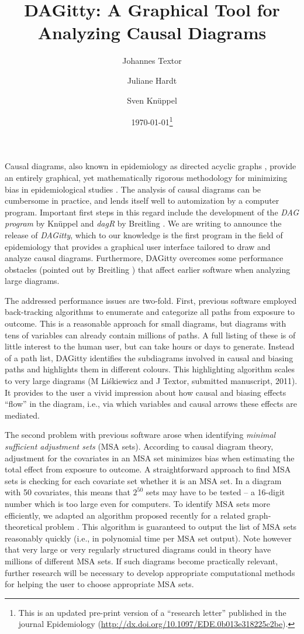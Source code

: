 \documentclass[12pt,letterpaper]{article}
\title{DAGitty: A Graphical Tool for Analyzing Causal Diagrams}
\author{Johannes Textor \and Juliane Hardt \and Sven Kn\"uppel}
\date{\today\footnote{This is an updated pre-print 
version of a ``research letter'' published in the journal Epidemiology
(\url{http://dx.doi.org/10.1097/EDE.0b013e318225c2be}).}}
\begin{document}
\maketitle

Causal diagrams, also known in epidemiology as directed 
acyclic graphs \cite{Pearl2000,GreenlandPR1999},
provide an entirely graphical, yet mathematically
rigorous methodology for minimizing bias in epidemiological studies 
\cite{ShrierP2008,RothmanGL2008}. 
The analysis of causal diagrams can be cumbersome in practice, 
and lends itself well 
to automization by a computer program. Important first steps in this 
regard include the development of the \emph{DAG program} by 
Knüppel \cite{KnueppelS2010} and \emph{dagR} by Breitling 
\cite{Breitling2010}. We are writing to announce the release of 
\emph{DAGitty}, which to our knowledge is the first program 
in the field of epidemiology that provides a graphical user interface 
tailored to draw and analyze causal diagrams. Furthermore, DAGitty overcomes 
some performance obstacles (pointed out by Breitling \cite{Breitling2010})
that affect earlier software when analyzing large diagrams.

The addressed performance issues are two-fold.
First, previous software employed back-tracking algorithms \cite{KnueppelS2010} 
to enumerate and categorize 
all paths from exposure to outcome. This is a reasonable approach for small diagrams, 
but diagrams with tens of variables can already contain millions of paths. 
A full listing of these is of little interest to the human user, 
but can take hours or days to generate.
Instead of a path list, 
DAGitty identifies the subdiagrams involved 
in causal and biasing paths and highlights them in different colours. 
This highlighting algorithm scales to very large diagrams (M Liśkiewicz and J Textor,
submitted manuscript, 2011). It provides to the user 
a vivid impression about how causal and biasing effects ``flow'' in the
diagram, i.e., via which variables and causal arrows these effects are mediated. 

The second problem with previous software 
arose when identifying \emph{minimal sufficient adjustment sets} 
(MSA sets). According to causal diagram theory, 
adjustment for the covariates in an MSA set minimizes bias
when estimating the total effect from exposure to outcome. 
A straightforward approach 
to find MSA sets is checking for each covariate set  
whether it is an MSA set. In a diagram with
50 covariates, this means that $2^{50}$ sets may have to be tested -- 
a 16-digit number which is too large even for computers.  
To identify MSA sets more efficiently, 
we adapted an algorithm proposed recently for a related 
graph-theoretical problem \cite{Takata2010}. This algorithm
is guaranteed to output the list of MSA sets reasonably quickly 
(i.e., in polynomial time per MSA set output). Note however 
that very large or very regularly structured diagrams could in 
theory have millions of different MSA sets. If such diagrams become
practically relevant, further research will be necessary to develop appropriate
computational methods for helping the user to choose appropriate MSA 
sets.  
\end{document}
